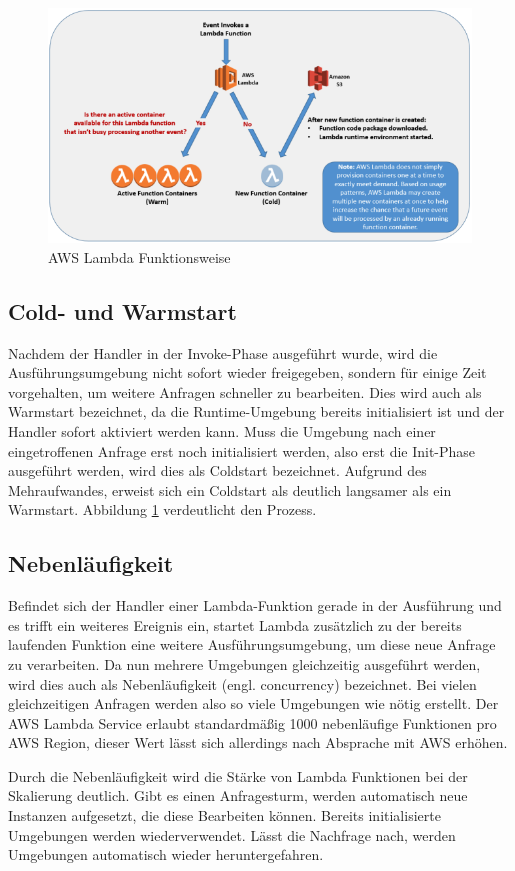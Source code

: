 \begin{figure}[H]
    \includegraphics[width=\textwidth]{img/lambda-architecture.png}
    
    \caption[AWS Lambda Funktionsweise]{AWS Lambda Funktionsweise\cite{noauthor_serverless_2017}}
    \label{fig:lambda-architecture}
\end{figure}

\subsection{Cold- und Warmstart}
Nachdem der Handler in der Invoke-Phase ausgeführt wurde, wird die Ausführungsumgebung nicht sofort wieder freigegeben, sondern für einige Zeit vorgehalten, um weitere Anfragen schneller zu bearbeiten. Dies wird auch als Warmstart bezeichnet, da die Runtime-Umgebung bereits initialisiert ist und der Handler sofort aktiviert werden kann.
Muss die Umgebung nach einer eingetroffenen Anfrage erst noch initialisiert werden, also erst die Init-Phase ausgeführt werden, wird dies als Coldstart bezeichnet. Aufgrund des Mehraufwandes, erweist sich ein Coldstart als deutlich langsamer als ein Warmstart. Abbildung \ref{fig:lambda-architecture} verdeutlicht den Prozess.

\subsection{Nebenläufigkeit}
Befindet sich der Handler einer Lambda-Funktion gerade in der Ausführung und es trifft ein weiteres Ereignis ein, startet Lambda zusätzlich zu der bereits laufenden Funktion eine weitere Ausführungsumgebung, um diese neue Anfrage zu verarbeiten. Da nun mehrere Umgebungen gleichzeitig ausgeführt werden, wird dies auch als Nebenläufigkeit (engl. concurrency) bezeichnet. Bei vielen gleichzeitigen Anfragen werden also so viele Umgebungen wie nötig erstellt. Der AWS Lambda Service erlaubt standardmäßig 1000 nebenläufige Funktionen pro AWS Region, dieser Wert lässt sich allerdings nach Absprache mit AWS erhöhen.

Durch die Nebenläufigkeit wird die Stärke von Lambda Funktionen bei der Skalierung deutlich. Gibt es einen Anfragesturm, werden automatisch neue Instanzen aufgesetzt, die diese Bearbeiten können. Bereits initialisierte Umgebungen werden wiederverwendet. Lässt die Nachfrage nach, werden Umgebungen automatisch wieder heruntergefahren. 